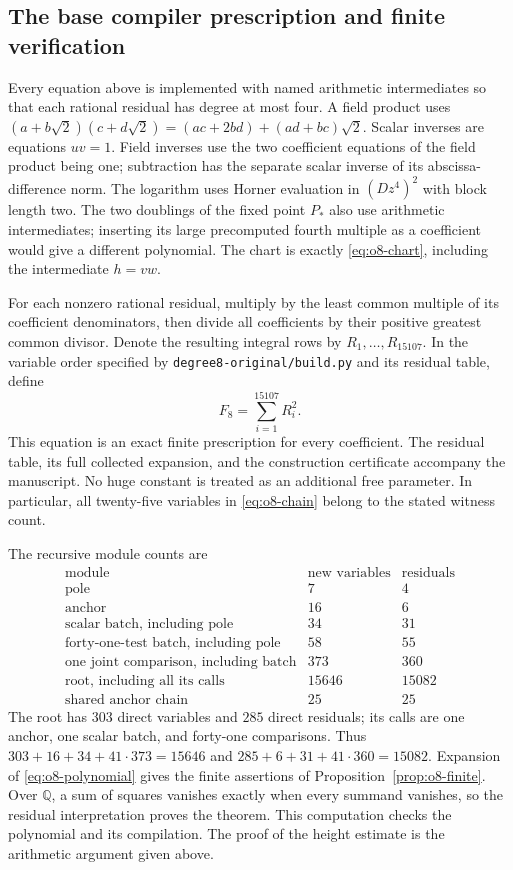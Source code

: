 \documentclass[11pt]{article}
\theoremstyle{definition}
\theoremstyle{remark}
\newcommand{\Q}{\mathbb Q}
\begin{document}
\subsection{The base compiler prescription and finite verification}

Every equation above is implemented with named arithmetic intermediates
so that each rational residual has degree at most four. A field product
uses $(a+b\sqrt2)(c+d\sqrt2)=(ac+2bd)+(ad+bc)\sqrt2$.
Scalar inverses are equations $uv=1$. Field inverses use the two
coefficient equations of the field product being one; subtraction has
the separate scalar inverse of its abscissa-difference norm.
The logarithm uses Horner evaluation in $(Dz^4)^2$ with block length
two. The two doublings of the fixed point $P_*$ also use arithmetic
intermediates; inserting its large precomputed fourth multiple as a
coefficient would give a different polynomial. The chart is exactly
\eqref{eq:o8-chart}, including the intermediate $h=vw$.

For each nonzero rational residual, multiply by the least common multiple
of its coefficient denominators, then divide all coefficients by their
positive greatest common divisor. Denote the resulting integral rows
by $R_1,\ldots,R_{15107}$. In the variable order specified by
\texttt{degree8-original/build.py} and its residual table, define
\begin{equation}\label{eq:o8-polynomial}
 F_8=\sum_{i=1}^{15107}R_i^2.
\end{equation}
This equation is an exact finite prescription for every coefficient.
The residual table, its full collected expansion, and the construction
certificate accompany the manuscript. No huge constant is treated as
an additional free parameter. In particular, all twenty-five variables
in \eqref{eq:o8-chain} belong to the stated witness count.

The recursive module counts are
\[
\begin{array}{c|rr}
 \text{module}&\text{new variables}&\text{residuals}\\\hline
 \text{pole}&7&4\\
 \text{anchor}&16&6\\
 \text{scalar batch, including pole}&34&31\\
 \text{forty-one-test batch, including pole}&58&55\\
 \text{one joint comparison, including batch}&373&360\\
 \text{root, including all its calls}&15646&15082\\
 \text{shared anchor chain}&25&25
\end{array}
\]
The root has $303$ direct variables and $285$ direct residuals; its
calls are one anchor, one scalar batch, and forty-one comparisons.
Thus $303+16+34+41\cdot373=15646$ and
$285+6+31+41\cdot360=15082$. Expansion of \eqref{eq:o8-polynomial}
gives the finite assertions of Proposition~\ref{prop:o8-finite}.
Over $\Q$, a sum of squares vanishes exactly when every summand
vanishes, so the residual interpretation proves the theorem.
This computation checks the polynomial and its compilation. The proof
of the height estimate is the arithmetic argument given above.
\end{document}
